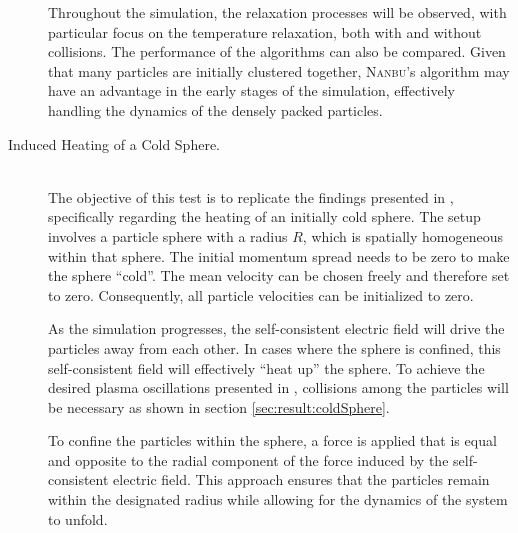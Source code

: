 \begin{description}
    Throughout the simulation, the relaxation processes will be observed, with particular focus on the temperature relaxation, both with and without collisions. The performance of the algorithms can also be compared. Given that many particles are initially clustered together, \textsc{Nanbu}'s algorithm may have an advantage in the early stages of the simulation, effectively handling the dynamics of the densely packed particles.

    \item[Induced Heating of a Cold Sphere.] \hfill \\
    The objective of this test is to replicate the findings presented in \cite[595]{Mitchell2015}, specifically regarding the heating of an initially cold sphere. The setup involves a particle sphere with a radius $R$, which is spatially homogeneous within that sphere. The initial momentum spread needs to be zero to make the sphere ``cold''. The mean velocity can be chosen freely and therefore set to zero. Consequently, all particle velocities can be initialized to zero.

    As the simulation progresses, the self-consistent electric field will drive the particles away from each other. In cases where the sphere is confined, this self-consistent field will effectively ``heat up'' the sphere. To achieve the desired plasma oscillations presented in \cite{Mitchell2015}, collisions among the particles will be necessary as shown in section \ref{sec:result:coldSphere}.
    
    To confine the particles within the sphere, a force is applied that is equal and opposite to the radial component of the force induced by the self-consistent electric field. This approach ensures that the particles remain within the designated radius while allowing for the dynamics of the system to unfold.


\end{description}
